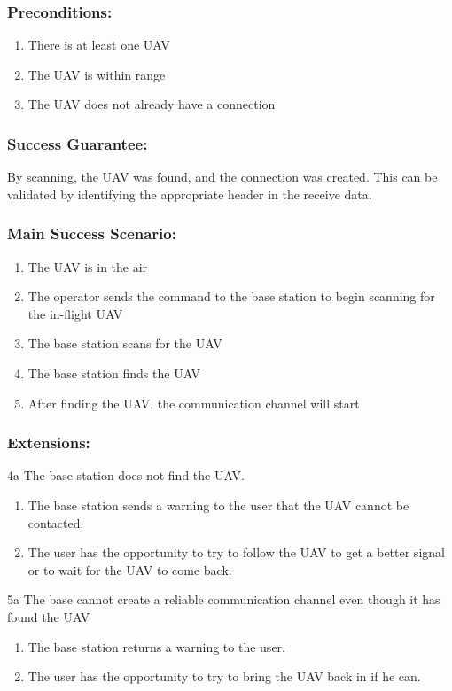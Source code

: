 \documentclass[ProductRequirements.tex]{subfiles}
\begin{document}
		\subsubsection*{Preconditions:}
			\begin{enumerate}\itemsep1pt
				\item There is at least one UAV
				\item The UAV is within range
				\item The UAV does not already have a connection
			\end{enumerate}
		\subsubsection*{Success Guarantee:}
			By scanning, the UAV was found, and the connection was created. This can be validated by identifying the appropriate header in the receive data. 
		\subsubsection*{Main Success Scenario:}
			\begin{enumerate}\itemsep1pt
				\item The UAV is in the air
				\item The operator sends the command to the base station to begin scanning for the in-flight UAV
				\item The base station scans for the UAV
				\item The base station finds the UAV
				\item After finding the UAV, the communication channel will start
			\end{enumerate}
		\subsubsection*{Extensions:}
		4a The base station does not find the UAV.
		\begin{enumerate}
			\item The base station sends a warning to the user that the UAV cannot be contacted.
			\item The user has the opportunity to try to follow the UAV to get a better signal or to wait for the UAV to come back.
		\end{enumerate}
		5a The base cannot create a reliable communication channel even though it has found the UAV
		\begin{enumerate}
			\item The base station returns a warning to the user.
			\item The user has the opportunity to try to bring the UAV back in if he can.
		\end{enumerate}
\end{document}
